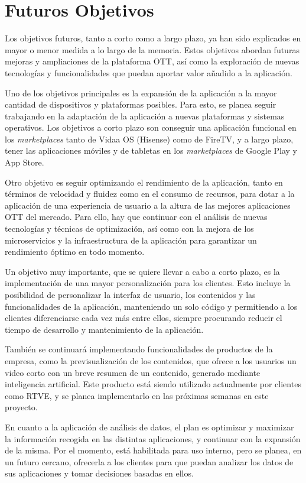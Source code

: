 \chapter{Futuros Objetivos}
\label{chap:futuros_objetivos}

Los objetivos futuros, tanto a corto como a largo plazo, ya han sido explicados en mayor o menor medida a lo largo de la memoria.
Estos objetivos abordan futuras mejoras y ampliaciones de la plataforma OTT, así como la exploración de nuevas tecnologías y
funcionalidades que puedan aportar valor añadido a la aplicación. 

Uno de los objetivos principales es la expansión de la aplicación a la mayor cantidad de dispositivos y plataformas posibles.
Para esto, se planea seguir trabajando en la adaptación de la aplicación a nuevas plataformas y sistemas operativos. Los objetivos a 
corto plazo son conseguir una aplicación funcional en los \textit{marketplaces} tanto de Vidaa OS (Hisense) como de FireTV, y a largo plazo, tener las 
aplicaciones móviles y de tabletas en los \textit{marketplaces} de Google Play y App Store.

Otro objetivo es seguir optimizando el rendimiento de la aplicación, tanto en términos de velocidad y fluidez como en el consumo de recursos, para 
dotar a la aplicación de una experiencia de usuario a la altura de las mejores aplicaciones OTT del mercado. Para ello, hay que continuar con 
el análisis de nuevas tecnologías y técnicas de optimización, así como con la mejora de los microservicios y la infraestructura de la aplicación
para garantizar un rendimiento óptimo en todo momento.

Un objetivo muy importante, que se quiere llevar a cabo a corto plazo, es la implementación de una mayor personalización para los 
clientes. Esto incluye la posibilidad de personalizar la interfaz de usuario, los contenidos y las funcionalidades de la aplicación, manteniendo 
un solo código y permitiendo a los clientes diferenciarse cada vez más entre ellos, siempre procurando reducir el tiempo de desarrollo y
mantenimiento de la aplicación.

También se continuará implementando funcionalidades de productos de la empresa, como la previsualización de los contenidos, que ofrece a los 
usuarios un video corto con un breve resumen de un contenido, generado mediante inteligencia artificial. Este producto está siendo
utilizado actualmente por clientes como RTVE, y se planea implementarlo en las próximas semanas en este proyecto.

En cuanto a la aplicación de análisis de datos, el plan es optimizar y maximizar la información recogida en las distintas aplicaciones, y 
continuar con la expansión de la misma. Por el momento, está habilitada para uso interno, pero se planea, en un futuro cercano,
ofrecerla a los clientes para que puedan analizar los datos de sus aplicaciones y tomar decisiones basadas en ellos.

